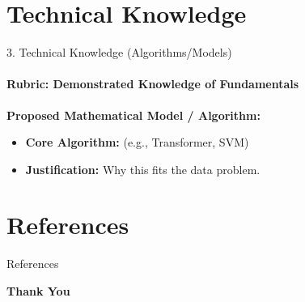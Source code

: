 \documentclass[aspectratio=169, 11pt]{beamer}
\begin{document}
\section{Technical Knowledge}
\begin{frame}{3. Technical Knowledge (Algorithms/Models)}
    \framesubtitle{Rubric: Demonstrated Knowledge of Fundamentals}
    \textbf{Proposed Mathematical Model / Algorithm:}
    \begin{itemize}
        \item \textbf{Core Algorithm:} (e.g., Transformer, SVM)
        \item \textbf{Justification:} Why this fits the data problem.
    \end{itemize}
    
    \vspace{0.3cm}
    \centering
\end{frame}

\section{References}
\begin{frame}[allowframebreaks]{References}
    
     
\end{frame}

\begin{frame}
    \centering    
    {\Huge \textbf{\textcolor{amritaMaroon}{Thank You}}}
\end{frame}
\end{document}
